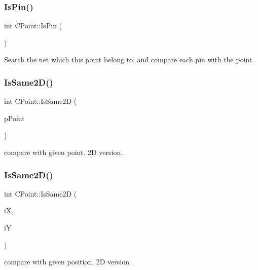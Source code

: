 \subsubsection{\texorpdfstring{IsPin()}{IsPin()}}
{\footnotesize\ttfamily int C\+Point\+::\+Is\+Pin (\begin{DoxyParamCaption}{ }\end{DoxyParamCaption})}

Search the net which this point belong to, and compare each pin with the point. \mbox{\label{classCPoint_a723515e5fe780b2bc7c4357f210ff6ac}} 
\subsubsection{\texorpdfstring{IsSame2D()}{IsSame2D()}\hspace{0.1cm}{\footnotesize\ttfamily [1/2]}}
{\footnotesize\ttfamily int C\+Point\+::\+Is\+Same2D (\begin{DoxyParamCaption}\item[{\mbox{\hyperlink{classCPoint}{C\+Point}} $\ast$}]{p\+Point }\end{DoxyParamCaption})}



compare with given point. 2D version. 

\mbox{\label{classCPoint_a42c0cc1723520246e543073a13a2c45a}} 
\subsubsection{\texorpdfstring{IsSame2D()}{IsSame2D()}\hspace{0.1cm}{\footnotesize\ttfamily [2/2]}}
{\footnotesize\ttfamily int C\+Point\+::\+Is\+Same2D (\begin{DoxyParamCaption}\item[{int}]{iX,  }\item[{int}]{iY }\end{DoxyParamCaption})}



compare with given position. 2D version. 

\mbox{\label{classCPoint_a5a759d36a6b0bb0e8300077f53924362}} 
